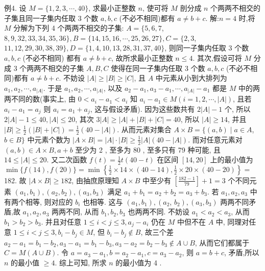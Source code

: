 例4. 设 $M=\{1,2,3, \cdots, 40\}$, 求最小正整数 $n$, 使可将 $M$ 剖分成 $n$ 个两两不相交的子集且同一子集内任取 3 个数 $a, b, c$ (不必不相同)都有 $a \neq b+c$.
解:$n=4$ 时,将 $M$ 分解为下列 4 个两两不相交的子集: $A=\{5,6,7$, $8,9,32,33,34,35,36\}, B=\{14,15,16, \cdots, 25,26,27\}, C=\{2,3$, $11,12,29,30,38,39\}, D=\{1,4,10,13,28,31,37,40\}$, 则同一子集内任取 3 个数 $a, b, c$ (不必不相同) 都有 $a \neq b+c$, 故所求最小正整数 $n \leqslant 4$.
其次,假设可将 $M$ 分成 3 个两两不相交的子集 $A, B, C$ 使得在同一子集内任取 3 个数 $a, b, c$ (不必不相同)都有 $a \neq b+c$. 不妨设 $|A| \geqslant|B| \geqslant|C|$,
且 $A$ 中元素从小到大排列为 $a_1, a_2, \cdots, a_{|A|}$. 于是 $a_1, a_2, \cdots, a_{|A|}$, 以及 $a_2- a_1, a_3-a_1, \cdots, a_{|A|}-a_1$ 都是 $M$ 中的两两不同的数(事实上, 由 $0<a_i-a_1<a_i$ 知 $a_i-a_1 \in M(i=1,2, \cdots,|A|)$, 且若 $a_i-a_1=a_j$ 则 $a_i=a_1+a_j$, 这与假设矛盾). 因为这些数共有 $2|A|-1$ 个, 所以 $2|A|-1 \leqslant 40,|A| \leqslant 20$, 其次 $3|A| \geqslant|A|+|B|+|C|=40$, 所以 $|A| \geqslant 14$, 并且 $|B| \geqslant \frac{1}{2}(|B|+|C|)=\frac{1}{2}(40-|A|)$. 从而元素对集合 $A \times B=\{(a, b) \mid a \in A$, $b \in B\}$ 中元素个数为 $|A \times B|=|A| \cdot|B| \geqslant \frac{1}{2}|A|(40-|A|)$. 而对任意元素对 $(a, b) \in A \times B, a+b$ 至少为 2 , 至多为 80 , 至多只有 79 种可能, 且 $14 \leqslant |A| \leqslant 20$. 又二次函数 $f(t)=\frac{1}{2} t(40-t)$ 在区间 $[14,20]$ 上的最小值为 $\min \{f(14), f(20)\}=\min \left\{\frac{1}{2} \times 14 \times(40-14), \frac{1}{2} \times 20 \times(40-20)\right\}=$ 182. 故 $|A \times B| \geqslant 182$, 由抽庶原理知 $A \times B$ 中至少有 $\left[\frac{182-1}{79}\right]+1=3$ 个不同元素 $\left(a_1, b_1\right),\left(a_2, b_2\right),\left(a_3, b_3\right)$ 满足 $a_1+b_1=a_2+b_2=a_3+b_3$.
若 $a_1, a_2, a_3$ 中有两个相等, 则对应的 $b_i$ 也相等.
这与 $\left(a_1, b_1\right),\left(a_2\right.$, $\left.b_2\right),\left(a_3, b_3\right)$ 两两不同矛盾,故 $a_1, a_2, a_3$ 两两不同, 从而 $b_1, b_2, b_3$ 也两两不同.
不妨设 $a_1<a_2<a_3$, 从而 $b_1>b_2>b_3$. 并且对任意 $1 \leqslant i<j \leqslant 3, a_j- a_i$ 仍在 $M$ 中但不在 $A$ 中, 同理对任意 $1 \leqslant i<j \leqslant 3, b_i-b_j \in M$, 但 $b_i- b_j \notin B$, 故三个差 $a_2-a_1=b_1-b_2, a_3-a_1=b_1-b_3, a_3-a_2=b_2-b_3 \notin A \cup B$, 从而它们都属于 $C=M(A \cup B)$. 令 $a=a_3-a_1, b=a_2-a_1, c= a_3-a_2$, 则 $a=b+c$, 矛盾,所以 $n$ 的最小值 $\geqslant 4$.
综上可知, 所求 $n$ 的最小值为 4 .



